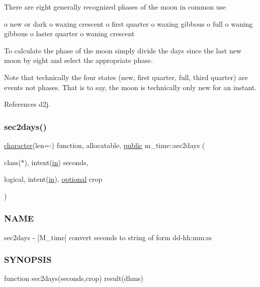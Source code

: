 \begin{DoxyVerb}
There are eight generally recognized phases of the moon in common use

o new or dark o waxing crescent o first quarter o waxing gibbous o full o waning gibbous o laster quarter o waning crescent

To calculate the phase of the moon simply divide the days since the last new moon by eight and select the appropriate phase.

Note that technically the four states (new, first quarter, full, third quarter) are events not phases. That is to say, the moon is technically only new for an instant. 

References d2j.

\mbox{\label{namespacem__time_a7788285d79b8d58323b05e9a30a2d992}} 
\subsubsection{\texorpdfstring{sec2days()}{sec2days()}}
{\footnotesize\ttfamily \hyperlink{option__stopwatch_83_8txt_abd4b21fbbd175834027b5224bfe97e66}{character}(len=\+:) function, allocatable, \hyperlink{M__stopwatch_83_8txt_a2f74811300c361e53b430611a7d1769f}{public} m\+\_\+time\+::sec2days (\begin{DoxyParamCaption}\item[{class($\ast$), intent(\hyperlink{M__journal_83_8txt_afce72651d1eed785a2132bee863b2f38}{in})}]{seconds,  }\item[{logical, intent(\hyperlink{M__journal_83_8txt_afce72651d1eed785a2132bee863b2f38}{in}), \hyperlink{option__stopwatch_83_8txt_aa4ece75e7acf58a4843f70fe18c3ade5}{optional}}]{crop }\end{DoxyParamCaption})}



\subsubsection*{N\+A\+ME}

sec2days -\/ \mbox{[}M\+\_\+time\mbox{]} convert seconds to string of form dd-\/hh\+:mm\+:ss 

\subsubsection*{S\+Y\+N\+O\+P\+S\+IS}

\begin{DoxyVerb}function sec2days(seconds,crop) result(dhms)


\end{DoxyVerb}
\end{DoxyVerb}
